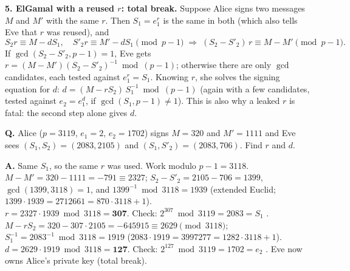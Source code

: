 \textbf{5. ElGamal with a reused $r$: total break.} Suppose Alice signs two messages $M$ and $M'$ with the same $r$. Then $S_1 = e_1^r$ is the same in both (which also tells Eve that $r$ was reused), and
\[
S_2 r \equiv M - d S_1, \quad S'_2 r \equiv M' - d S_1 \pmod{p-1} \;\Longrightarrow\; (S_2 - S'_2)\,r \equiv M - M' \pmod{p-1}.
\]
If $\gcd(S_2 - S'_2, p - 1) = 1$, Eve gets $r = (M - M')(S_2 - S'_2)^{-1} \bmod (p-1)$; otherwise there are only $\gcd$ candidates, each tested against $e_1^r = S_1$. Knowing $r$, she solves the signing equation for $d$: $d = (M - r S_2)\,S_1^{-1} \bmod (p-1)$ (again with a few candidates, tested against $e_2 = e_1^d$, if $\gcd(S_1, p-1) \ne 1$). This is also why a leaked $r$ is fatal: the second step alone gives $d$.
\begin{worked}
\textbf{Q.} Alice ($p = 3119$, $e_1 = 2$, $e_2 = 1702$) signs $M = 320$ and $M' = 1111$ and Eve sees $(S_1, S_2) = (2083, 2105)$ and $(S_1, S'_2) = (2083, 706)$. Find $r$ and $d$.

\textbf{A.} Same $S_1$, so the same $r$ was used. Work modulo $p - 1 = 3118$.\\
$M - M' = 320 - 1111 = -791 \equiv 2327$; \;$S_2 - S'_2 = 2105 - 706 = 1399$, $\gcd(1399, 3118) = 1$, and $1399^{-1} \bmod 3118 = 1939$ (extended Euclid; $1399 \cdot 1939 = 2712661 = 870 \cdot 3118 + 1$).\\
$r = 2327 \cdot 1939 \bmod 3118 = \mathbf{307}$. Check: $2^{307} \bmod 3119 = 2083 = S_1$ \checkmark.\\
$M - r S_2 = 320 - 307 \cdot 2105 = -645915 \equiv 2629 \pmod{3118}$; \;$S_1^{-1} = 2083^{-1} \bmod 3118 = 1919$ ($2083 \cdot 1919 = 3997277 = 1282 \cdot 3118 + 1$).\\
$d = 2629 \cdot 1919 \bmod 3118 = \mathbf{127}$. Check: $2^{127} \bmod 3119 = 1702 = e_2$ \checkmark. Eve now owns Alice's private key (total break).
\end{worked}

